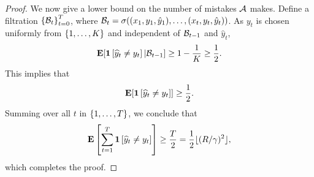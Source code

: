 \begin{proof}
We now give a lower bound on the number of mistakes $\mathcal{A}$ makes.
Define a filtration $\cbr{\calB_t}_{t=0}^T$,
where $\mathcal{B}_t = \sigma((x_1, y_1, \hat{y}_1), \ldots, (x_t, y_t, \hat{y}_t))$.
As $y_t$ is chosen uniformly from $\cbr{1,\ldots,K}$ and independent of
$\mathcal{B}_{t-1}$ and $\hat{y}_t$,
\[ \operatorname*{\mathbf{E}}[ \mathbf{1}\left[\widehat y_t \neq y_t \right] | \mathcal{B}_{t-1} ] \geq 1 - \frac 1 K \geq \frac 1 2. \]
This implies that
\[ \operatorname*{\mathbf{E}}[ \mathbf{1}\left[\widehat y_t \neq y_t \right] ] \geq \frac 1 2. \]
Summing over all $t$ in $\cbr{1,\ldots,T}$, we conclude that
\[ \Exp \sbr{ \sum_{t=1}^T \indicator{\widehat y_t \neq y_t} } \geq \frac T 2 = \frac 1 2 \lfloor (R/\gamma)^2 \rfloor, \]
which completes the proof.
\end{proof}

